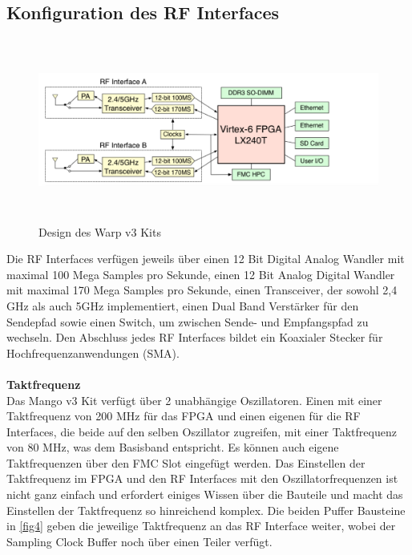 \documentclass[letterpaper,11pt]{article}
\begin{document}
\begin{onehalfspace}
\subsection{Konfiguration des RF Interfaces}
\label{ssc:RF}
\begin{figure}[H]
\begin{center}
\includegraphics[width = 16cm,height=6cm]{RF-inteface.PNG}
\caption{Design des Warp v3 Kits  \cite{[3]}}
\label{fig3}
\end{center}
\end{figure} 
\noindent Die RF Interfaces verfügen jeweils über einen 12 Bit Digital Analog Wandler mit maximal 100 Mega Samples pro Sekunde, einen 12 Bit Analog Digital Wandler mit maximal 170 Mega Samples pro Sekunde, einen Transceiver, der sowohl 2,4 GHz als auch 5GHz implementiert, einen Dual Band Verstärker für den Sendepfad sowie einen Switch, um zwischen Sende- und Empfangspfad zu wechseln. Den Abschluss jedes RF Interfaces bildet ein Koaxialer Stecker für Hochfrequenzanwendungen (SMA).\\
\\
\noindent \textbf{Taktfrequenz}\\
Das Mango v3 Kit verfügt über 2 unabhängige  Oszillatoren. Einen mit einer Taktfrequenz von 200 MHz für das FPGA und einen eigenen für die RF Interfaces, die beide auf den selben Oszillator zugreifen, mit einer Taktfrequenz von 80 MHz, was dem Basisband entspricht. Es können auch eigene Taktfrequenzen über den FMC Slot eingefügt werden. Das Einstellen der Taktfrequenz im FPGA und den RF Interfaces mit den Oszillatorfrequenzen ist nicht ganz einfach und erfordert einiges Wissen über die Bauteile und macht das Einstellen der Taktfrequenz so hinreichend komplex. Die beiden Puffer Bausteine in \autoref{fig4} geben die jeweilige Taktfrequenz an das RF Interface weiter, wobei der Sampling Clock Buffer noch über einen Teiler verfügt. 
\begin{figure}[H]
\begin{center}

\end{center}
\end{figure}
\end{onehalfspace}
\end{document}
